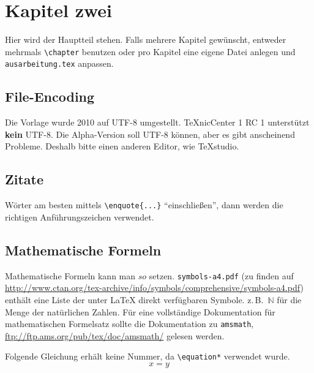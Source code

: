 \chapter{Kapitel zwei}
\label{chap:k2}

Hier wird der Hauptteil stehen. Falls mehrere Kapitel gewünscht, entweder mehrmals \texttt{\textbackslash{}chapter} benutzen oder pro Kapitel eine eigene Datei anlegen und \texttt{ausarbeitung.tex} anpassen.

\section{File-Encoding}
Die Vorlage wurde 2010 auf UTF-8 umgestellt. TeXnicCenter 1 RC 1 unterstützt \textbf{kein} UTF-8. Die Alpha-Version soll UTF-8 können, aber es gibt anscheinend Probleme. Deshalb bitte einen anderen Editor, wie \zB TeXstudio.

\section{Zitate}
Wörter am besten mittels \texttt{\textbackslash enquote\{...\}} \enquote{einschließen}, dann werden die richtigen Anführungszeichen verwendet.

\section{Mathematische Formeln}
\label{sec:mf}
Mathematische Formeln kann man $so$ setzen. \texttt{symbols-a4.pdf} (zu finden auf \url{http://www.ctan.org/tex-archive/info/symbols/comprehensive/symbols-a4.pdf}) enthält eine Liste der unter LaTeX direkt verfügbaren Symbole. z.\,B.\ $\mathbb{N}$ für die Menge der natürlichen Zahlen. Für eine vollständige Dokumentation für mathematischen Formelsatz sollte die Dokumentation zu \texttt{amsmath}, \url{ftp://ftp.ams.org/pub/tex/doc/amsmath/} gelesen werden.

Folgende Gleichung erhält keine Nummer, da \texttt{\textbackslash equation*} verwendet wurde.
\begin{equation*}
x = y
\end{equation*}

